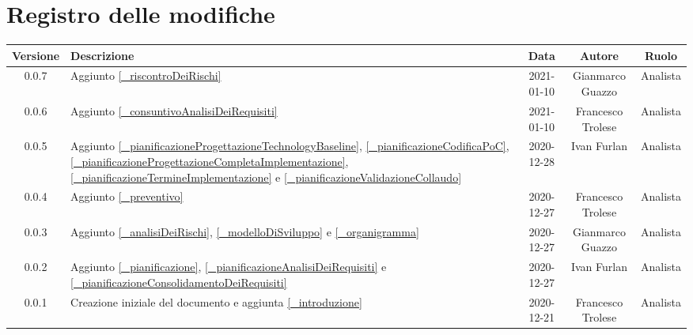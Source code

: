 \section*{Registro delle modifiche}

\begin{center}
	\begin{longtable}{|c|p{5cm}|c|c|c|}
		\hline
		\rowcolor{lighter-grayer}
		\textbf{Versione} & \textbf{Descrizione} & \textbf{Data} & \textbf{Autore} & \textbf{Ruolo} \\
		\hline
		\endfirsthead


		\hline
		0.0.7 & Aggiunto \ref{_riscontroDeiRischi} & 2021-01-10 & Gianmarco Guazzo & Analista\\
		0.0.6 & Aggiunto \ref{_consuntivoAnalisiDeiRequisiti} & 2021-01-10 & Francesco Trolese & Analista\\
		0.0.5 & Aggiunto \ref{_pianificazioneProgettazioneTechnologyBaseline}, \ref{_pianificazioneCodificaPoC}, \ref{_pianificazioneProgettazioneCompletaImplementazione}, \ref{_pianificazioneTermineImplementazione} e \ref{_pianificazioneValidazioneCollaudo} & 2020-12-28 & Ivan Furlan & Analista\\
		0.0.4 & Aggiunto \ref{_preventivo} & 2020-12-27 & Francesco Trolese & Analista\\
		0.0.3 & Aggiunto \ref{_analisiDeiRischi}, \ref{_modelloDiSviluppo} e \ref{_organigramma} & 2020-12-27 & Gianmarco Guazzo & Analista\\
		0.0.2 & Aggiunto \ref{_pianificazione}, \ref{_pianificazioneAnalisiDeiRequisiti} e \ref{_pianificazioneConsolidamentoDeiRequisiti}& 2020-12-27 & Ivan Furlan & Analista\\
		0.0.1 & Creazione iniziale del documento e aggiunta \ref{_introduzione} & 2020-12-21 & Francesco Trolese & Analista\\
		\hline
	\end{longtable}
\end{center}
